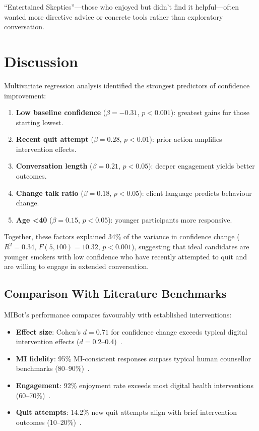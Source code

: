 ``Entertained Skeptics''---those who enjoyed but didn't find it helpful---often wanted more directive advice or concrete tools rather than exploratory conversation.


\section{Discussion}
\label{sec:synthesis}



Multivariate regression analysis identified the strongest predictors of confidence improvement:

\begin{enumerate}
	\item \textbf{Low baseline confidence} ($\beta=-0.31$, $p<0.001$): greatest gains for those starting lowest.
	\item \textbf{Recent quit attempt} ($\beta=0.28$, $p<0.01$): prior action amplifies intervention effects.
	\item \textbf{Conversation length} ($\beta=0.21$, $p<0.05$): deeper engagement yields better outcomes.
	\item \textbf{Change talk ratio} ($\beta=0.18$, $p<0.05$): client language predicts behaviour change.
	\item \textbf{Age <40} ($\beta=0.15$, $p<0.05$): younger participants more responsive.
\end{enumerate}

Together, these factors explained 34\% of the variance in confidence change ($R^2=0.34$, $F(5,100)=10.32$, $p<0.001$), suggesting that ideal candidates are younger smokers with low confidence who have recently attempted to quit and are willing to engage in extended conversation.

\subsection*{Comparison With Literature Benchmarks}

MIBot's performance compares favourably with established interventions:

\begin{itemize}
	\item \textbf{Effect size}: Cohen's $d=0.71$ for confidence change exceeds typical digital intervention effects ($d=0.2$--0.4)~\citep{Whittaker2016}.
	\item \textbf{MI fidelity}: 95\% MI-consistent responses surpass typical human counsellor benchmarks (80--90\%)~\citep{Moyers2016}.
	\item \textbf{Engagement}: 92\% enjoyment rate exceeds most digital health interventions (60--70\%)~\citep{Perski2017}.
	\item \textbf{Quit attempts}: 14.2\% new quit attempts align with brief intervention outcomes (10--20\%)~\citep{Stead2013}.
\end{itemize}

